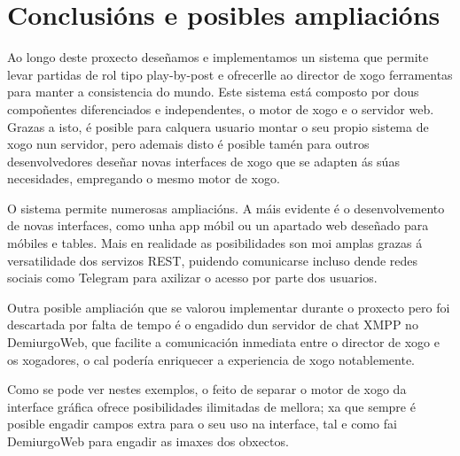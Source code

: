 \chapter{Conclusións e posibles ampliacións}
Ao longo deste proxecto deseñamos e implementamos un sistema que permite levar
partidas de rol tipo play-by-post e ofrecerlle ao director de xogo ferramentas
para manter a consistencia do mundo. Este sistema está composto por dous
compoñentes diferenciados e independentes, o motor de xogo e o servidor web.
Grazas a isto, é posible para calquera usuario montar o seu propio sistema de
xogo nun servidor, pero ademais disto é posible tamén para outros
desenvolvedores deseñar novas interfaces de xogo que se adapten ás súas
necesidades, empregando o mesmo motor de xogo.
\par
O sistema permite numerosas ampliacións. A máis evidente é o desenvolvemento de
novas interfaces, como unha app móbil ou un apartado web deseñado para móbiles e
tables. Mais en realidade as posibilidades son moi amplas grazas á versatilidade
dos servizos REST, puidendo comunicarse incluso dende redes sociais como
Telegram para axilizar o acesso por parte dos usuarios.
\par
Outra posible ampliación que se valorou implementar durante o proxecto pero foi
descartada por falta de tempo é o engadido dun servidor de chat XMPP no
DemiurgoWeb, que facilite a comunicación inmediata entre o director de xogo e os
xogadores, o cal podería enriquecer a experiencia de xogo notablemente.
\par
Como se pode ver nestes exemplos, o feito de separar o motor de xogo da
interface gráfica ofrece posibilidades ilimitadas de mellora; xa que sempre é
posible engadir campos extra para o seu uso na interface, tal e como fai
DemiurgoWeb para engadir as imaxes dos obxectos.
